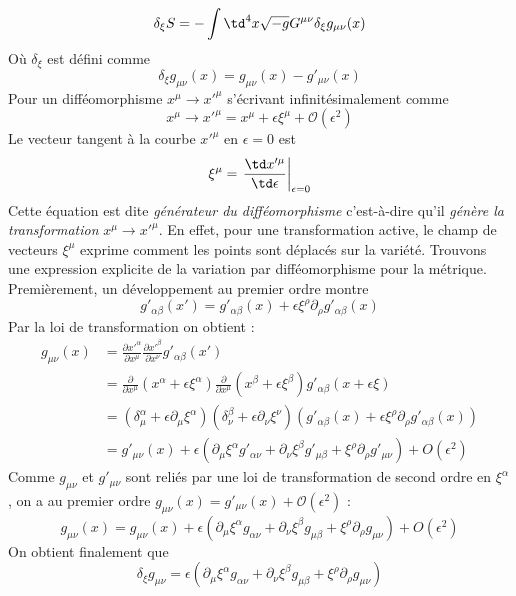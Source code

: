 \begin{equation}
    \delta_{\xi}S = - \int \td ^4x \sqrt{-g}G^{\mu \nu}\delta_{\xi}g_{\mu \nu}(x)
\end{equation}
Où $\delta_\xi$ est défini comme
\begin{equation}
    \delta_{\xi}g_{\mu \nu}(x) = g_{\mu \nu}(x) - g'_{\mu \nu}(x)
\end{equation}
Pour un difféomorphisme $x^{\mu} \to x'^{\mu}$ s'écrivant infinitésimalement comme 
\begin{equation}
    x^{\mu} \to x'^{\mu} = x^{\mu} + \epsilon\xi^{\mu} + \mathcal{O}(\epsilon^2)
\end{equation}
Le vecteur tangent à la courbe $x'^{\mu}$ en $\epsilon = 0$ est 
\begin{equation}
    \xi ^{\mu} = \left. \frac{\td x'^{\mu}}{\td \epsilon}\right|_{\epsilon = 0}
\end{equation}
Cette équation est dite \emph{générateur du difféomorphisme} c'est-à-dire qu'il \emph{génère la transformation} $x^{\mu} \rightarrow x'^{\mu}$. En effet, pour une transformation active, le champ de vecteurs $\xi^\mu$ exprime comment les points sont déplacés sur la variété. Trouvons une expression explicite de la variation par difféomorphisme pour la métrique. Premièrement, un développement au premier ordre montre 
\begin{equation}
    g'_{\alpha \beta}(x') = g'_{\alpha \beta}(x) + \epsilon \xi^{\rho}\partial_{\rho}g'_{\alpha \beta}(x)
\end{equation}
Par la loi de transformation on obtient :
\begin{align}
    g_{\mu \nu}(x) &= \frac{\partial x'^{\alpha}}{ \partial x^{\mu}}\frac{\partial x'^{\beta}}{\partial x^{\nu}}g'_{\alpha \beta}(x')\\
    &= \frac{\partial}{\partial x^{\mu}}(x^{\alpha} + \epsilon \xi^{\alpha})\frac{\partial}{\partial x^{\mu}}(x^{\beta} + \epsilon \xi^{\beta})g'_{\alpha \beta}(x + \epsilon\xi)\\
    &= (\delta^{\alpha}_{\mu} + \epsilon \partial_{\mu}\xi^{\alpha})(\delta^{\beta}_{\nu} + \epsilon\partial_{\nu}\xi^{\nu})(g'_{\alpha \beta}(x) + \epsilon \xi^{\rho}\partial_{\rho}g'_{\alpha \beta}(x))\\
    &= g'_{\mu \nu}(x) + \epsilon(\partial_{\mu}\xi^{\alpha}g'_{\alpha \nu} + \partial_{\nu}\xi^{\beta}g'_{\mu \beta} + \xi^{\rho}\partial_{\rho}g'_{\mu \nu}) + O(\epsilon^2)
\end{align}
Comme $g_{\mu\nu}$ et $g'_{\mu\nu}$ sont reliés par une loi de transformation de second ordre en $\xi^\alpha$, on a au premier ordre $g_{\mu\nu}(x) = g'_{\mu\nu}(x) + \mathcal{O}(\epsilon^2)$ :
\begin{equation}
     g_{\mu \nu}(x) = g_{\mu \nu}(x) + \epsilon(\partial_{\mu}\xi^{\alpha}g_{\alpha \nu} + \partial_{\nu}\xi^{\beta}g_{\mu \beta} + \xi^{\rho}\partial_{\rho}g_{\mu \nu}) + O(\epsilon^2)
\end{equation}
On obtient finalement que 
\begin{equation}
    \delta_{\xi}g_{\mu \nu} = \epsilon(\partial_{\mu}\xi^{\alpha}g_{\alpha \nu} + \partial_{\nu}\xi^{\beta}g_{\mu \beta} + \xi^{\rho}\partial_{\rho}g_{\mu \nu}) 
\end{equation}

